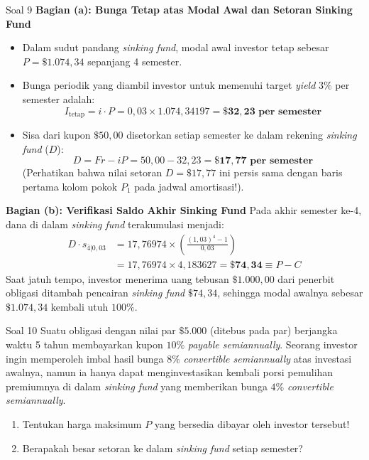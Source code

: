 \documentclass[11pt,a4paper]{article}
\begin{document}
\begin{solutionbox}{Soal 9}
\textbf{Bagian (a): Bunga Tetap atas Modal Awal dan Setoran Sinking Fund}
\begin{itemize}
    \item Dalam sudut pandang \textit{sinking fund}, modal awal investor tetap sebesar $P = \$1.074{,}34$ sepanjang 4 semester.
    \item Bunga periodik yang diambil investor untuk memenuhi target \textit{yield} $3\%$ per semester adalah:
    \begin{equation*}
        I_{\text{tetap}} = i \cdot P = 0{,}03 \times 1.074{,}34197 = \mathbf{\$32{,}23 \text{ per semester}}
    \end{equation*}
    \item Sisa dari kupon $\$50{,}00$ disetorkan setiap semester ke dalam rekening \textit{sinking fund} ($D$):
    \begin{equation*}
        D = Fr - iP = 50{,}00 - 32{,}23 = \mathbf{\$17{,}77 \text{ per semester}}
    \end{equation*}
    (Perhatikan bahwa nilai setoran $D = \$17{,}77$ ini persis sama dengan baris pertama kolom pokok $P_1$ pada jadwal amortisasi!).
\end{itemize}

\textbf{Bagian (b): Verifikasi Saldo Akhir Sinking Fund}
Pada akhir semester ke-4, dana di dalam \textit{sinking fund} terakumulasi menjadi:
\begin{align*}
    D \cdot s_{\overline{4}|0{,}03} &= 17{,}76974 \times \left( \frac{(1{,}03)^4 - 1}{0{,}03} \right) \\[0.3em]
    &= 17{,}76974 \times 4{,}183627 = \mathbf{\$74{,}34} \equiv P - C
\end{align*}
Saat jatuh tempo, investor menerima uang tebusan $\$1.000{,}00$ dari penerbit obligasi ditambah pencairan \textit{sinking fund} $\$74{,}34$, sehingga modal awalnya sebesar $\$1.074{,}34$ kembali utuh $100\%$.
\end{solutionbox}

\vspace{1.2em}

\begin{problembox}{Soal 10}
Suatu obligasi dengan nilai par $\$5.000$ (ditebus pada par) berjangka waktu 5 tahun membayarkan kupon $10\%$ \textit{payable semiannually}. Seorang investor ingin memperoleh imbal hasil bunga $8\%$ \textit{convertible semiannually} atas investasi awalnya, namun ia hanya dapat menginvestasikan kembali porsi pemulihan premiumnya di dalam \textit{sinking fund} yang memberikan bunga $4\%$ \textit{convertible semiannually}.
\begin{enumerate}[label=(\alph*)]
    \item Tentukan harga maksimum $P$ yang bersedia dibayar oleh investor tersebut!
    \item Berapakah besar setoran ke dalam \textit{sinking fund} setiap semester?
\end{enumerate}
\end{problembox}
\end{document}
